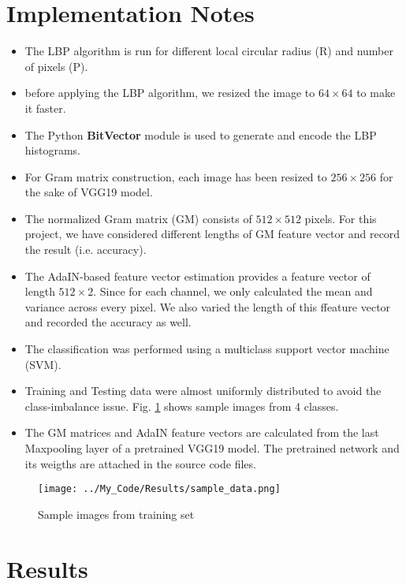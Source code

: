 \documentclass{article}
\begin{document}
\section{Implementation Notes}
\begin{itemize}
\item The LBP algorithm is run for different local circular radius (R) and number of pixels (P).
\item before applying the LBP algorithm, we resized the image to $64\times 64$ to make it faster.
\item The Python \textbf{BitVector} module is used to generate and encode the LBP histograms.
\item For Gram matrix construction, each image has been resized to $256\times 256$ for the sake of VGG19 model.
\item The normalized Gram matrix (GM) consists of $512\times 512$ pixels. For this project, we have considered different lengths of GM feature vector and record the result (i.e. accuracy).
\item The AdaIN-based feature vector estimation provides a feature vector of length $512\times 2$. Since for each channel, we only calculated the mean and variance across every pixel. We also varied the length of this ffeature vector and recorded the accuracy as well.
\item The classification was performed using a multiclass support vector machine (SVM).
\item Training and Testing data were almost uniformly distributed to avoid the class-imbalance issue. Fig. \ref{fig:sample_data} shows sample images from 4 classes.
\item The GM matrices and AdaIN feature vectors are calculated from the last Maxpooling layer of a pretrained VGG19 model. The pretrained network and its weigths are attached in the source code files.
\end{itemize}
\begin{figure}[!htbp]
     \centering
     \captionsetup[subfigure]{labelformat=empty}
    \texttt{[image: ../My\_Code/Results/sample\_data.png]}
    \caption{Sample images from training set}
    \label{fig:sample_data}
\end{figure}

\newpage
\section{Results}
\end{document}
